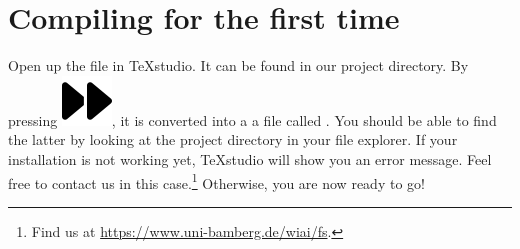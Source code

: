 \section*{Compiling for the first time}
Open up the file  in \TeX{}studio. 
It can be found in our project directory.
By pressing \includegraphics[width=.8em]{graphics/faForward.png}, it is converted into a a file called .
You should be able to find the latter by looking at the project directory in your file explorer.
If your installation is not working yet, \TeX{}studio will show you an error message.
Feel free to contact us in this case.\footnote{Find us at \url{https://www.uni-bamberg.de/wiai/fs}.}
Otherwise, you are now ready to go!

\newpage
\nopagecolor

